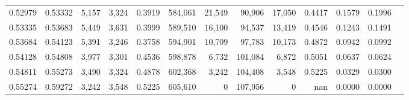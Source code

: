 \begin{tabular}{rrrrrrrrrrrrr}
0.52979 & 0.53332 &  5,157 & 3,324 &                                     0.3919 & 584,061 &  21,549 &  90,906 &  17,050 & 0.4417 & 0.1579 & 0.1996 \\
0.53335 & 0.53683 &  5,449 & 3,631 &                                     0.3999 & 589,510 &  16,100 &  94,537 &  13,419 & 0.4546 & 0.1243 & 0.1491 \\
0.53684 & 0.54123 &  5,391 & 3,246 &                                     0.3758 & 594,901 &  10,709 &  97,783 &  10,173 & 0.4872 & 0.0942 & 0.0992 \\
0.54128 & 0.54808 &  3,977 & 3,301 &                                     0.4536 & 598,878 &   6,732 & 101,084 &   6,872 & 0.5051 & 0.0637 & 0.0624 \\
0.54811 & 0.55273 &  3,490 & 3,324 &                                     0.4878 & 602,368 &   3,242 & 104,408 &   3,548 & 0.5225 & 0.0329 & 0.0300 \\
0.55274 & 0.59272 &  3,242 & 3,548 &                                     0.5225 & 605,610 &       0 & 107,956 &       0 &    nan & 0.0000 & 0.0000 \\
\bottomrule
\end{tabular}
